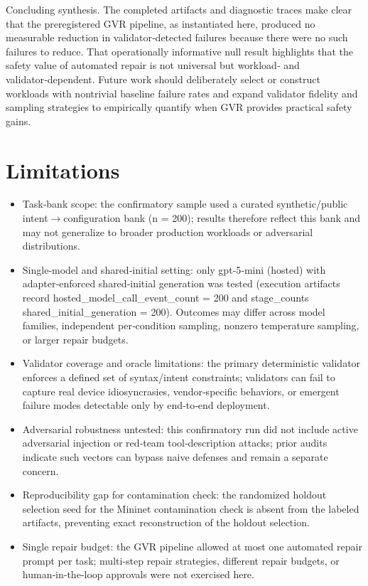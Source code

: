 \documentclass[conference]{IEEEtran}
\begin{document}
Concluding synthesis. The completed artifacts and diagnostic traces make clear that the preregistered GVR pipeline, as instantiated here, produced no measurable reduction in validator‑detected failures because there were no such failures to reduce. That operationally informative null result highlights that the safety value of automated repair is not universal but workload‑ and validator‑dependent. Future work should deliberately select or construct workloads with nontrivial baseline failure rates and expand validator fidelity and sampling strategies to empirically quantify when GVR provides practical safety gains.

\section{Limitations}
\begin{itemize}
\item Task‑bank scope: the confirmatory sample used a curated synthetic/public intent\ensuremath{\rightarrow}configuration bank (n = 200); results therefore reflect this bank and may not generalize to broader production workloads or adversarial distributions.
\item Single‑model and shared‑initial setting: only gpt‑5‑mini (hosted) with adapter‑enforced shared‑initial generation was tested (execution artifacts record hosted\_model\_call\_event\_count = 200 and stage\_counts shared\_initial\_generation = 200). Outcomes may differ across model families, independent per‑condition sampling, nonzero temperature sampling, or larger repair budgets.
\item Validator coverage and oracle limitations: the primary deterministic validator enforces a defined set of syntax/intent constraints; validators can fail to capture real device idiosyncrasies, vendor‑specific behaviors, or emergent failure modes detectable only by end‑to‑end deployment.
\item Adversarial robustness untested: this confirmatory run did not include active adversarial injection or red‑team tool‑description attacks; prior audits indicate such vectors can bypass naive defenses and remain a separate concern.
\item Reproducibility gap for contamination check: the randomized holdout selection seed for the Mininet contamination check is absent from the labeled artifacts, preventing exact reconstruction of the holdout selection.
\item Single repair budget: the GVR pipeline allowed at most one automated repair prompt per task; multi‑step repair strategies, different repair budgets, or human‑in‑the‑loop approvals were not exercised here.
\end{itemize}
\end{document}
